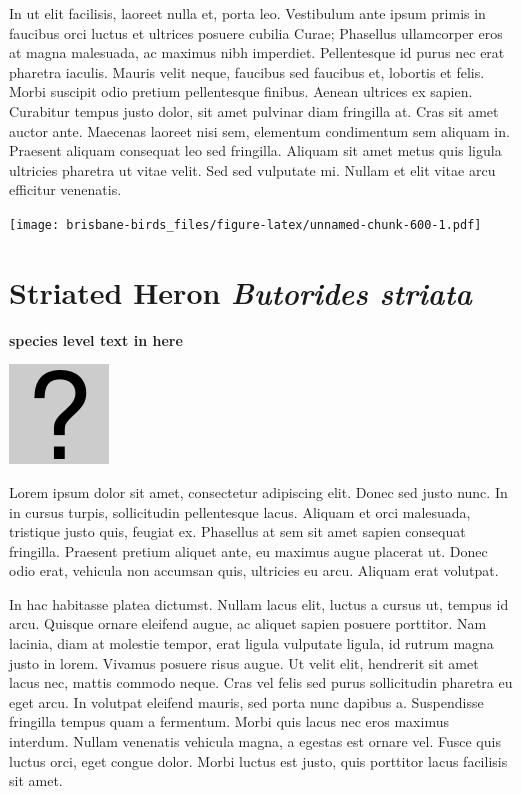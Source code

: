 \documentclass[]{book}
\let\origfigure\figure
\let\endorigfigure\endfigure
\renewenvironment{figure}[1][2] {
  \expandafter\origfigure\expandafter[H]
} {
  \endorigfigure
}
\begin{document}
In ut elit facilisis, laoreet nulla et, porta leo. Vestibulum ante ipsum
primis in faucibus orci luctus et ultrices posuere cubilia Curae;
Phasellus ullamcorper eros at magna malesuada, ac maximus nibh
imperdiet. Pellentesque id purus nec erat pharetra iaculis. Mauris velit
neque, faucibus sed faucibus et, lobortis et felis. Morbi suscipit odio
pretium pellentesque finibus. Aenean ultrices ex sapien. Curabitur
tempus justo dolor, sit amet pulvinar diam fringilla at. Cras sit amet
auctor ante. Maecenas laoreet nisi sem, elementum condimentum sem
aliquam in. Praesent aliquam consequat leo sed fringilla. Aliquam sit
amet metus quis ligula ultricies pharetra ut vitae velit. Sed sed
vulputate mi. Nullam et elit vitae arcu efficitur venenatis.

\begin{figure}
\centering
\texttt{[image: brisbane-birds\_files/figure-latex/unnamed-chunk-600-1.pdf]}
\caption{\label{fig:unnamed-chunk-600}insert figure caption}
\end{figure}

\section{\texorpdfstring{Striated Heron \emph{Butorides
striata}}{Striated Heron Butorides striata}}\label{striated-heron-butorides-striata}

\textbf{species level text in here}

\begin{figure}
\centering
\includegraphics{assets/missing.png}
\caption{No image for species}
\end{figure}

Lorem ipsum dolor sit amet, consectetur adipiscing elit. Donec sed justo
nunc. In in cursus turpis, sollicitudin pellentesque lacus. Aliquam et
orci malesuada, tristique justo quis, feugiat ex. Phasellus at sem sit
amet sapien consequat fringilla. Praesent pretium aliquet ante, eu
maximus augue placerat ut. Donec odio erat, vehicula non accumsan quis,
ultricies eu arcu. Aliquam erat volutpat.

In hac habitasse platea dictumst. Nullam lacus elit, luctus a cursus ut,
tempus id arcu. Quisque ornare eleifend augue, ac aliquet sapien posuere
porttitor. Nam lacinia, diam at molestie tempor, erat ligula vulputate
ligula, id rutrum magna justo in lorem. Vivamus posuere risus augue. Ut
velit elit, hendrerit sit amet lacus nec, mattis commodo neque. Cras vel
felis sed purus sollicitudin pharetra eu eget arcu. In volutpat eleifend
mauris, sed porta nunc dapibus a. Suspendisse fringilla tempus quam a
fermentum. Morbi quis lacus nec eros maximus interdum. Nullam venenatis
vehicula magna, a egestas est ornare vel. Fusce quis luctus orci, eget
congue dolor. Morbi luctus est justo, quis porttitor lacus facilisis sit
amet.
\end{document}
